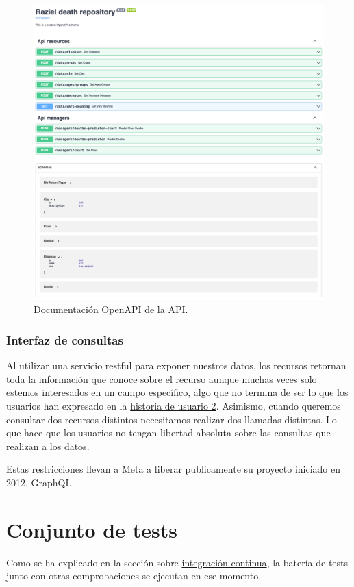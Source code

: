 \begin{figure}[h]
	\centering	
	\includegraphics[width=\textwidth]{doc/logos/imgs/openapi.png}
	\caption{ Documentación OpenAPI de la API. }
    \label{fig:worst_f_value}
\end{figure}

\subsubsection{Interfaz de consultas}
Al utilizar una servicio restful para exponer nuestros datos, los recursos retornan toda
la información que conoce sobre el recurso aunque muchas veces solo estemos interesados en
un campo específico, algo que no termina de ser lo que los usuarios han expresado en la
\hyperref[sec:hu2]{historia de usuario 2}. Asimismo, cuando queremos consultar dos
recursos distintos necesitamos realizar dos llamadas distintas. Lo que hace que los
usuarios no tengan libertad absoluta sobre las consultas que realizan a los datos.

Estas restricciones llevan a Meta a liberar publicamente su proyecto iniciado en 2012,
GraphQL

\section{Conjunto de tests}
Como se ha explicado en la sección sobre \hyperref[sec:ci]{integración continua}, la
batería de tests junto con otras comprobaciones se ejecutan en ese momento.

